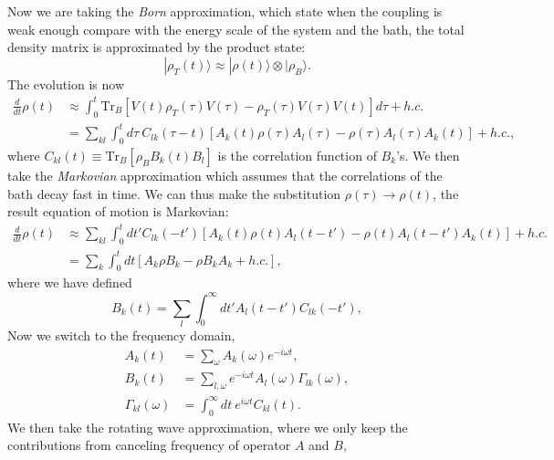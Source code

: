\documentclass[aps,prb,superscriptaddress,nofootinbib]{revtex4}
\begin{document}
Now we are taking the \textit{Born} approximation, which state when the coupling is weak enough compare with the energy scale of the system and the bath, the total density matrix is approximated by the product state:
\begin{equation}
	|\rho_T(t)\rangle \approx |\rho(t)\rangle \otimes |\rho_B\rangle.
\end{equation}
The evolution is now
\begin{equation}
\begin{aligned}
	\frac{d}{dt} \rho(t) &\approx \int_0^t \mathrm{Tr}_B\left[ V(t) \rho_T(\tau) V(\tau)- \rho_T(\tau) V(\tau) V(t) \right]d\tau +h.c. \\
	&= \sum_{kl}\int_0^t d\tau\ C_{lk}(\tau - t) \left[A_k(t)\rho(\tau)A_l(\tau)-\rho(\tau)A_l(\tau)A_k(t)\right]+h.c.,
\end{aligned}
\end{equation}
where $C_{kl}(t) \equiv \mathrm{Tr}_B[\rho_B B_k(t) B_l ]$ is the correlation function of $B_k$'s. 
We then take the \textit{Markovian} approximation which assumes that the correlations of the bath decay fast in time.
We can thus make the substitution $\rho(\tau) \rightarrow \rho(t)$, the result equation of motion is Markovian:
\begin{equation}
\begin{aligned}
	\frac{d}{dt} \rho(t) &\approx \sum_{kl}\int_{0}^{t}dt' C_{lk}(-t') \left[A_k(t)\rho(t)A_l(t-t')-\rho(t)A_l(t-t')A_k(t)\right]+h.c. \\
	&= \sum_{k} \int_0^t dt \left[A_k \rho B_{k}-\rho B_{k} A_k+h.c.\right],
\end{aligned}
\end{equation}
where we have defined
\begin{equation}
	B_{k}(t) = \sum_l \int_0^{\infty} dt' A_l(t-t')C_{lk}(-t'),
\end{equation}
Now we switch to the frequency domain,
\begin{equation}
\begin{aligned}
	A_k(t) &= \sum_\omega A_{k}(\omega) e^{-i\omega t}, \\
	B_k(t) &= \sum_{l,\omega} e^{-i\omega t} A_l(\omega)\Gamma_{lk}(\omega), \\
	\Gamma_{kl}(\omega) &= \int_0^\infty dt\ e^{i\omega t}C_{kl}(t).
\end{aligned}
\end{equation}
We then take the rotating wave approximation, where we only keep the contributions from canceling frequency of operator $A$ and $B$,
\end{document}
